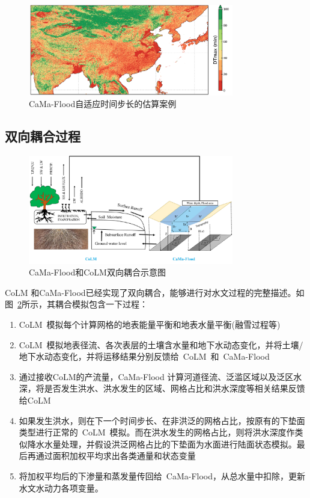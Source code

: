 {
  \begin{figure}[htbp]
    \centering
    \includegraphics[width=0.8\textwidth]{Figures/陆地表面的水分循环/自适应时间步长的估算.png}
    \caption{CaMa-Flood自适应时间步长的估算案例}
    \label{fig:自适应时间步长的估算}
  \end{figure}
}
\subsection{双向耦合过程}
{
  \begin{figure}[htbp]
    \centering
    \includegraphics[width=0.8\textwidth]{Figures/陆地表面的水分循环/双向耦合.pdf}
    \caption{CaMa-Flood和CoLM双向耦合示意图}
    \label{fig:双向耦合}
  \end{figure}
}

CoLM 和CaMa-Flood已经实现了双向耦合，能够进行对水文过程的完整描述。如图~\ref{fig:双向耦合}所示，其耦合模拟包含一下过程：
\begin{enumerate}
  \item CoLM~模拟每个计算网格的地表能量平衡和地表水量平衡(融雪过程等)
  \item CoLM~模拟地表径流、各次表层的土壤含水量和地下水动态变化，并将土壤/地下水动态变化，并将运移结果分别反馈给~CoLM~和~CaMa-Flood~
  \item 通过接收CoLM的产流量，CaMa-Flood 计算河道径流、泛滥区域以及泛区水深，将是否发生洪水、洪水发生的区域、网格占比和洪水深度等相关结果反馈给CoLM
  \item 如果发生洪水，则在下一个时间步长、在非洪泛的网格占比，按原有的下垫面类型进行正常的~CoLM~模拟。而在洪水发生的网格占比，则将洪水深度作类似降水水量处理，并假设洪泛网格占比的下垫面为水面进行陆面状态模拟。最后再通过面积加权平均求出各类通量和状态变量
  \item 将加权平均后的下渗量和蒸发量传回给~CaMa-Flood，从总水量中扣除，更新水文水动力各项变量。

\end{enumerate}

